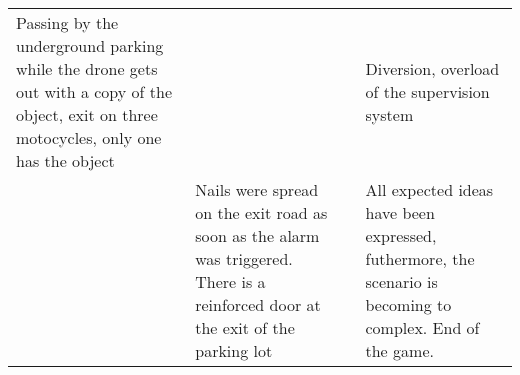 \documentclass[11pt]{article} %
\begin{document}
\begin{longtable}{|p{3cm}|p{3cm}|p{3cm}|p{3cm}|}
Passing by the underground parking while the drone gets out with a copy 
of the object, exit on three motocycles, only one has the object & & &
Diversion, overload of the supervision system \\
& Nails were spread on the exit road as soon as the alarm was triggered.
There is a reinforced door at the exit of the parking lot & & All expected ideas have been 
expressed, futhermore, the scenario is becoming to complex. End of the game.
\end{longtable}
\end{document}
